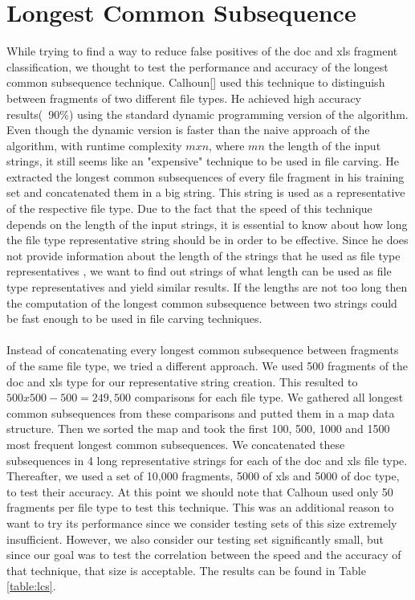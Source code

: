\chapter{Longest Common Subsequence}
While trying to find a way to reduce false positives of the doc and xls fragment classification, we thought to test the performance and accuracy of the longest common subsequence technique. Calhoun[] used this technique to distinguish between fragments of two different file types. He achieved high accuracy results(~90\%) using the standard dynamic programming version of the algorithm. Even though the dynamic version is faster than the naive approach of the algorithm, with runtime complexity $mxn$, where $m n $ the length of the input strings, it still seems like an "expensive" technique to be used in file carving. He extracted the longest common subsequences of every file fragment in his training set and concatenated them in a big string. This string is used as a representative of the respective file type.  Due to the fact that the speed of this technique depends on the length of the input strings, it is essential to know about how long the file type representative string should be in order to be effective. Since he does not provide information about the length of the strings that he used as file type representatives , we want to find out strings of what length can be used as file type representatives and yield similar results. If the lengths are not too long then the computation of the longest common subsequence between two strings could be fast enough to be used in file carving techniques.\\\\
 Instead of concatenating every longest common subsequence between fragments of the same file type, we tried a different approach. We used 500 fragments of the doc and xls type for our representative string creation. This resulted to $500x500 - 500 = 249,500$ comparisons for each file type. We gathered all longest common subsequences from these comparisons and putted them in a map data structure. Then we sorted the map and took the first 100, 500, 1000 and 1500 most frequent longest common subsequences. We concatenated these subsequences in 4 long representative strings for each of the doc and xls file type. Thereafter, we used a set of 10,000 fragments, 5000 of xls and 5000 of doc type, to test their accuracy. At this point we should note that Calhoun used only 50 fragments per file type to test this technique. This was an additional reason to want to try its performance since we consider testing sets of this size extremely insufficient. However, we also consider our testing set significantly small, but since our goal was to test the correlation between the speed and the accuracy of that technique, that size is acceptable. The results can be found in Table \ref{table:lcs}.\\\\
